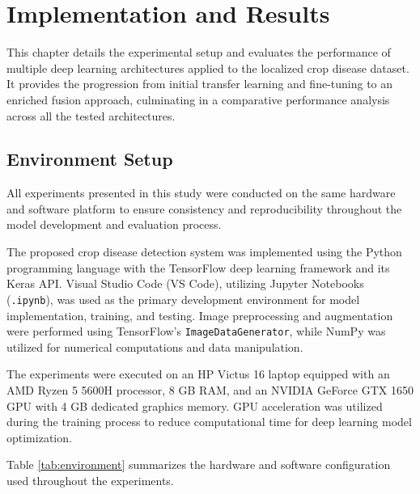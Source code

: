 \chapter{Implementation and Results}
This chapter details the experimental setup and evaluates the performance of multiple deep learning architectures applied to the localized crop disease dataset. It provides the progression from initial transfer learning and fine-tuning to an enriched fusion approach, culminating in a comparative performance analysis across all the tested architectures.

\section{Environment Setup}
All experiments presented in this study were conducted on the same hardware and software platform to ensure consistency and reproducibility throughout the model development and evaluation process.

The proposed crop disease detection system was implemented using the Python programming language with the TensorFlow deep learning framework and its Keras API. Visual Studio Code (VS Code), utilizing Jupyter Notebooks (\texttt{.ipynb}), was used as the primary development environment for model implementation, training, and testing. Image preprocessing and augmentation were performed using TensorFlow's \texttt{ImageDataGenerator}, while NumPy was utilized for numerical computations and data manipulation.

The experiments were executed on an HP Victus 16 laptop equipped with an AMD Ryzen 5 5600H processor, 8 GB RAM, and an NVIDIA GeForce GTX 1650 GPU with 4 GB dedicated graphics memory. GPU acceleration was utilized during the training process to reduce computational time for deep learning model optimization.

Table \ref{tab:environment} summarizes the hardware and software configuration used throughout the experiments.

